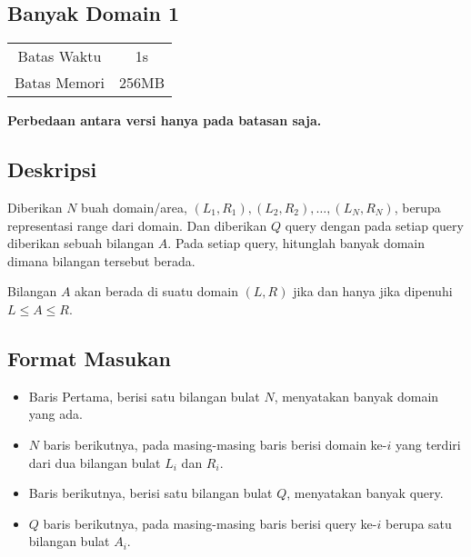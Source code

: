 \documentclass{article}
\begin{document}
\begin{center}
    \section*{Banyak Domain 1} %

    \begin{tabular}{ | c c | }
        \hline
        Batas Waktu  & 1s \\    %
        Batas Memori & 256MB \\  %
        \hline
    \end{tabular}
\end{center}

\begin{center}
    \textbf{Perbedaan antara versi hanya pada batasan saja.}
\end{center}

\subsection*{Deskripsi}

Diberikan $N$ buah domain/area, $(L_1, R_1), (L_2, R_2), …, (L_N, R_N)$, berupa representasi range dari domain. Dan diberikan $Q$ query dengan pada setiap query diberikan sebuah bilangan $A$.
Pada setiap query, hitunglah banyak domain dimana bilangan tersebut berada.

Bilangan $A$ akan berada di suatu domain $(L, R)$ jika dan hanya jika dipenuhi $L \leq A \leq R$.

\subsection*{Format Masukan}
\begin{itemize}
\item{Baris Pertama, berisi satu bilangan bulat $N$, menyatakan banyak domain yang ada.}

\item{$N$ baris berikutnya, pada masing-masing baris berisi domain ke-$i$ yang terdiri dari dua bilangan bulat $L_i$ dan $R_i$.}

\item{Baris berikutnya, berisi satu bilangan bulat $Q$, menyatakan banyak query.}

\item{$Q$ baris berikutnya, pada masing-masing baris berisi query ke-$i$ berupa satu bilangan bulat $A_i$.}

\end{itemize}
\end{document}
